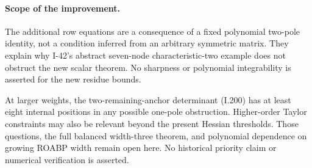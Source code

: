 \paragraph{Scope of the improvement.}
The additional row equations are a consequence of a fixed
polynomial two-pole identity, not a condition inferred from
an arbitrary symmetric matrix. They explain why I-42's
abstract seven-node characteristic-two example does not
obstruct the new scalar theorem. No sharpness or polynomial
integrability is asserted for the new residue bounds.

At larger weights, the two-remaining-anchor determinant
(I.200) has at least eight internal positions in any possible
one-pole obstruction. Higher-order Taylor constraints may
also be relevant beyond the present Hessian thresholds.
Those questions, the full balanced width-three theorem,
and polynomial dependence on growing ROABP width remain
open here. No historical priority claim or numerical
verification is asserted.
